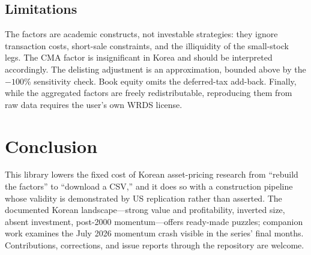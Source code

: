 \documentclass[11pt]{article}
\begin{document}
\subsection{Limitations}

The factors are academic constructs, not investable strategies: they ignore transaction costs, short-sale constraints, and the illiquidity of the small-stock legs. The CMA factor is insignificant in Korea and should be interpreted accordingly. The delisting adjustment is an approximation, bounded above by the $-100$\% sensitivity check. Book equity omits the deferred-tax add-back. Finally, while the aggregated factors are freely redistributable, reproducing them from raw data requires the user's own WRDS license.

\section{Conclusion}\label{sec:conclusion}

This library lowers the fixed cost of Korean asset-pricing research from ``rebuild the factors'' to ``download a CSV,'' and it does so with a construction pipeline whose validity is demonstrated by US replication rather than asserted. The documented Korean landscape---strong value and profitability, inverted size, absent investment, post-2000 momentum---offers ready-made puzzles; companion work examines the July 2026 momentum crash visible in the series' final months. Contributions, corrections, and issue reports through the repository are welcome.
\end{document}
